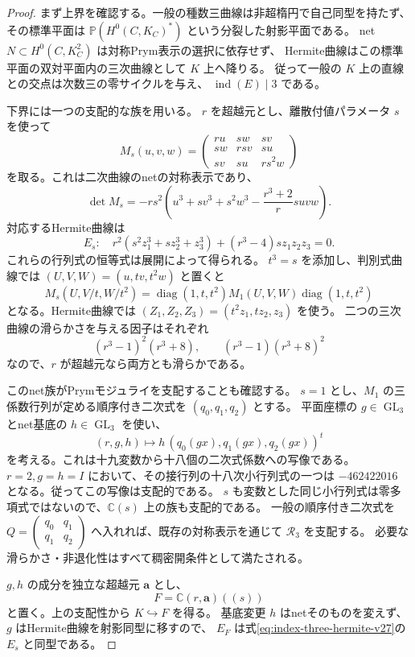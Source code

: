 \begin{proof}
まず上界を確認する。一般の種数三曲線は非超楕円で自己同型を持たず、
その標準平面は $\mathbb P(H^0(C,K_C)^*)$ という分裂した射影平面である。
net $N\subset H^0(C,K_C^2)$ は対称Prym表示の選択に依存せず、
Hermite曲線はこの標準平面の双対平面内の三次曲線として $K$ 上へ降りる。
従って一般の $K$ 上の直線との交点は次数三の零サイクルを与え、
$\operatorname{ind}(E)\mid3$ である。

下界には一つの支配的な族を用いる。
$r$ を超越元とし、離散付値パラメータ $s$ を使って
\[
 M_s(u,v,w)=
 \begin{pmatrix}
 ru&sw&sv\\
 sw&rsv&su\\
 sv&su&rs^2w
 \end{pmatrix}
\]
を取る。これは二次曲線のnetの対称表示であり、
\[
 \det M_s=-rs^2\left(
 u^3+sv^3+s^2w^3-\frac{r^3+2}{r}suvw\right).
\]
対応するHermite曲線は
\begin{equation}\label{eq:index-three-hermite-v27}
 E_s:\quad
 r^2(s^2z_1^3+sz_2^3+z_3^3)+(r^3-4)sz_1z_2z_3=0.
\end{equation}
これらの行列式の恒等式は展開によって得られる。
$t^3=s$ を添加し、判別式曲線では
$(U,V,W)=(u,tv,t^2w)$ と置くと
\[
 M_s(U,V/t,W/t^2)
 =\operatorname{diag}(1,t,t^2)
   M_1(U,V,W)
   \operatorname{diag}(1,t,t^2)
\]
となる。Hermite曲線では $(Z_1,Z_2,Z_3)=(t^2z_1,tz_2,z_3)$ を使う。
二つの三次曲線の滑らかさを与える因子はそれぞれ
\[
 (r^3-1)^2(r^3+8),\qquad (r^3-1)(r^3+8)^2
\]
なので、$r$ が超越元なら両方とも滑らかである。

このnet族がPrymモジュライを支配することも確認する。
$s=1$ とし、$M_1$ の三係数行列が定める順序付き二次式を $(q_0,q_1,q_2)$ とする。
平面座標の $g\in\operatorname{GL}_3$ とnet基底の $h\in\operatorname{GL}_3$ を使い、
\[
 (r,g,h)\longmapsto h\,(q_0(gx),q_1(gx),q_2(gx))^t
\]
を考える。これは十九変数から十八個の二次式係数への写像である。
$r=2,g=h=I$ において、その接行列の十八次小行列式の一つは
$-462422016$ となる。従ってこの写像は支配的である。
$s$ も変数とした同じ小行列式は零多項式ではないので、$\mathbb C(s)$ 上の族も支配的である。
一般の順序付き二次式を $Q=\left(\begin{smallmatrix}q_0&q_1\\q_1&q_2\end{smallmatrix}\right)$
へ入れれば、既存の対称表示を通じて $\mathcal R_3$ を支配する。
必要な滑らかさ・非退化性はすべて稠密開条件として満たされる。

$g,h$ の成分を独立な超越元 $\mathbf a$ とし、
\[
 F=\mathbb C(r,\mathbf a)((s))
\]
と置く。上の支配性から $K\hookrightarrow F$ を得る。
基底変更 $h$ はnetそのものを変えず、$g$ はHermite曲線を射影同型に移すので、
$E_F$ は式\eqref{eq:index-three-hermite-v27}の $E_s$ と同型である。


\end{proof}
